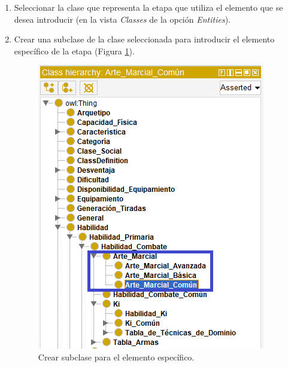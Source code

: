 \begin{enumerate}
    \item Seleccionar la clase que representa la etapa que utiliza el elemento que se desea introducir 
    (en la vista \textit{Classes} de la opción \textit{Entities}).
    \item Crear una subclase de la clase seleccionada para introducir el elemento específico de la etapa 
    (Figura \ref*{ElementoComun_1}).
    \begin{figure}[H]
        \centering
        \includegraphics[scale=0.6]{Figures/Protege/ElementoComun_1.png}
        \caption{Crear subclase para el elemento específico.}
        \label{ElementoComun_1}
    \end{figure}


\end{enumerate}
